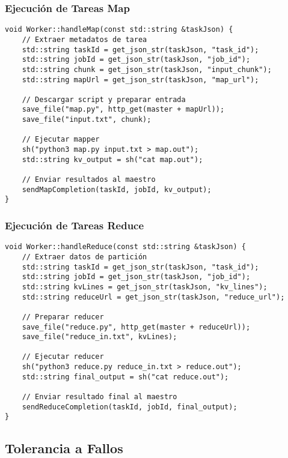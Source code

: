 \subsubsection{Ejecución de Tareas Map}

\begin{verbatim}
void Worker::handleMap(const std::string &taskJson) {
    // Extraer metadatos de tarea
    std::string taskId = get_json_str(taskJson, "task_id");
    std::string jobId = get_json_str(taskJson, "job_id");
    std::string chunk = get_json_str(taskJson, "input_chunk");
    std::string mapUrl = get_json_str(taskJson, "map_url");
    
    // Descargar script y preparar entrada
    save_file("map.py", http_get(master + mapUrl));
    save_file("input.txt", chunk);
    
    // Ejecutar mapper
    sh("python3 map.py input.txt > map.out");
    std::string kv_output = sh("cat map.out");
    
    // Enviar resultados al maestro
    sendMapCompletion(taskId, jobId, kv_output);
}
\end{verbatim}

\subsubsection{Ejecución de Tareas Reduce}

\begin{verbatim}
void Worker::handleReduce(const std::string &taskJson) {
    // Extraer datos de partición
    std::string taskId = get_json_str(taskJson, "task_id");
    std::string jobId = get_json_str(taskJson, "job_id");
    std::string kvLines = get_json_str(taskJson, "kv_lines");
    std::string reduceUrl = get_json_str(taskJson, "reduce_url");
    
    // Preparar reducer
    save_file("reduce.py", http_get(master + reduceUrl));
    save_file("reduce_in.txt", kvLines);
    
    // Ejecutar reducer
    sh("python3 reduce.py reduce_in.txt > reduce.out");
    std::string final_output = sh("cat reduce.out");
    
    // Enviar resultado final al maestro
    sendReduceCompletion(taskId, jobId, final_output);
}
\end{verbatim}

\subsection{Tolerancia a Fallos}

